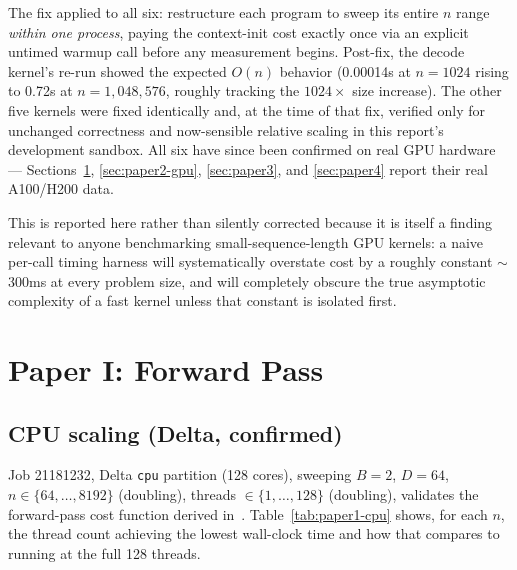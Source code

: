 \documentclass[11pt]{article}
\begin{document}
The fix applied to all six: restructure each program to sweep its
entire $n$ range \emph{within one process}, paying the context-init
cost exactly once via an explicit untimed warmup call before any
measurement begins. Post-fix, the decode kernel's re-run showed the
expected $O(n)$ behavior (0.00014s at $n=1024$ rising to 0.72s at
$n=1{,}048{,}576$, roughly tracking the $1024\times$ size increase).
The other five kernels were fixed identically and, at the time of that
fix, verified only for unchanged correctness and now-sensible relative
scaling in this report's development sandbox. All six have since been
confirmed on real GPU hardware --- Sections~\ref{sec:paper1},
\ref{sec:paper2-gpu}, \ref{sec:paper3}, and \ref{sec:paper4} report
their real A100/H200 data.

This is reported here rather than silently corrected because it is
itself a finding relevant to anyone benchmarking small-sequence-length
GPU kernels: a naive per-call timing harness will systematically
overstate cost by a roughly constant $\sim$300ms at every problem size,
and will completely obscure the true asymptotic complexity of a fast
kernel unless that constant is isolated first.

\section{Paper I: Forward Pass}
\label{sec:paper1}

\subsection{CPU scaling (Delta, confirmed)}

Job 21181232, Delta \texttt{cpu} partition (128 cores), sweeping
$B{=}2$, $D{=}64$, $n \in \{64, \ldots, 8192\}$ (doubling), threads
$\in \{1, \ldots, 128\}$ (doubling), validates the forward-pass cost
function derived in~\cite{paper1}. Table~\ref{tab:paper1-cpu} shows,
for each $n$, the thread count achieving the lowest wall-clock time and
how that compares to running at the full 128 threads.
\end{document}
